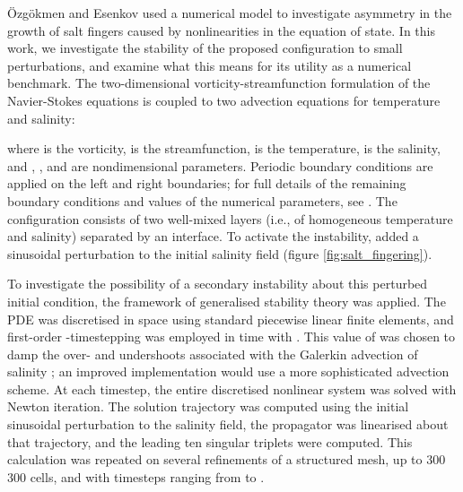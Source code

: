 \documentclass{siamltex}
\begin{document}
\newcommand{\Ra}{\textrm{Ra}}
\newcommand{\Sc}{\textrm{Sc}}
\renewcommand{\Pr}{\textrm{Pr}}

\"Ozg\"okmen and Esenkov \cite{ozgokmen1998b} used a numerical model to investigate asymmetry in the growth of salt fingers caused by
nonlinearities in the equation of state. In this work, we investigate the stability of the
proposed configuration to small perturbations, and examine what this means for its utility as a
numerical benchmark. The two-dimensional vorticity-streamfunction formulation of the
Navier-Stokes equations is coupled to two advection equations for temperature and salinity:

where  is the vorticity,  is the streamfunction,  is the temperature,  is the
salinity, and , ,  and  are nondimensional parameters.
Periodic boundary conditions are applied on the left and right boundaries; for full details of the
remaining boundary conditions and values of the numerical parameters, see \cite{ozgokmen1998b}. The
configuration consists of two well-mixed layers (i.e., of homogeneous temperature and salinity) separated
by an interface. To activate the instability, \cite{ozgokmen1998b} added a
sinusoidal perturbation to the initial salinity field (figure \ref{fig:salt_fingering}). 

To investigate the possibility of a secondary instability about this perturbed initial condition,
the framework of generalised stability theory was applied. The PDE was discretised in space using
standard piecewise linear finite elements, and first-order -timestepping was employed in time with
. This value of  was chosen to damp the over- and undershoots associated with the Galerkin advection of salinity \cite[\S 5]{davies2005}; an improved
implementation would use a more sophisticated advection scheme. At each timestep, the entire discretised nonlinear system was solved with
Newton iteration. The solution trajectory was computed using the initial sinusoidal perturbation to the
salinity field, the propagator was linearised about that trajectory, and the leading ten singular
triplets were computed. This calculation was repeated on several refinements of a structured mesh,
up to 300  300 cells, and with timesteps ranging from  to .
\end{document}
